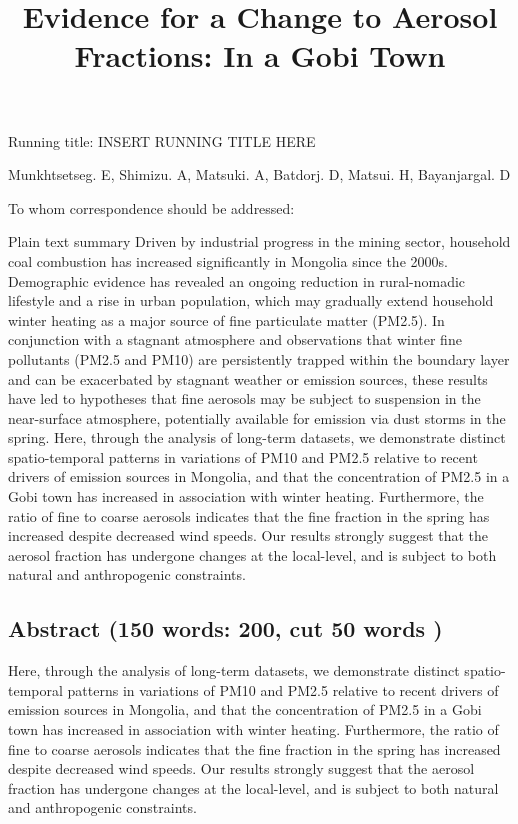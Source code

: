 \documentclass[
  11pt,
]{article}
\title{\textbf{Evidence for a Change to Aerosol Fractions: In a Gobi
Town}}
\author{}
\date{\vspace{-2.5em}}
\begin{document}
\maketitle

\vspace{35mm}

Running title: INSERT RUNNING TITLE HERE

\vspace{35mm}

Munkhtsetseg. E, Shimizu. A, Matsuki. A, Batdorj. D, Matsui. H,
Bayanjargal. D

\vspace{40mm}

To whom correspondence should be addressed:

\newpage
\linenumbers

Plain text summary Driven by industrial progress in the mining sector,
household coal combustion has increased significantly in Mongolia since
the 2000s. Demographic evidence has revealed an ongoing reduction in
rural-nomadic lifestyle and a rise in urban population, which may
gradually extend household winter heating as a major source of fine
particulate matter (PM2.5). In conjunction with a stagnant atmosphere
and observations that winter fine pollutants (PM2.5 and PM10) are
persistently trapped within the boundary layer and can be exacerbated by
stagnant weather or emission sources, these results have led to
hypotheses that fine aerosols may be subject to suspension in the
near-surface atmosphere, potentially available for emission via dust
storms in the spring. Here, through the analysis of long-term datasets,
we demonstrate distinct spatio-temporal patterns in variations of PM10
and PM2.5 relative to recent drivers of emission sources in Mongolia,
and that the concentration of PM2.5 in a Gobi town has increased in
association with winter heating. Furthermore, the ratio of fine to
coarse aerosols indicates that the fine fraction in the spring has
increased despite decreased wind speeds. Our results strongly suggest
that the aerosol fraction has undergone changes at the local-level, and
is subject to both natural and anthropogenic constraints.

\subsection{Abstract (150 words: 200, cut 50 words
)}\label{abstract-150-words-200-cut-50-words}

Here, through the analysis of long-term datasets, we demonstrate
distinct spatio-temporal patterns in variations of PM10 and PM2.5
relative to recent drivers of emission sources in Mongolia, and that the
concentration of PM2.5 in a Gobi town has increased in association with
winter heating. Furthermore, the ratio of fine to coarse aerosols
indicates that the fine fraction in the spring has increased despite
decreased wind speeds. Our results strongly suggest that the aerosol
fraction has undergone changes at the local-level, and is subject to
both natural and anthropogenic constraints.
\end{document}
